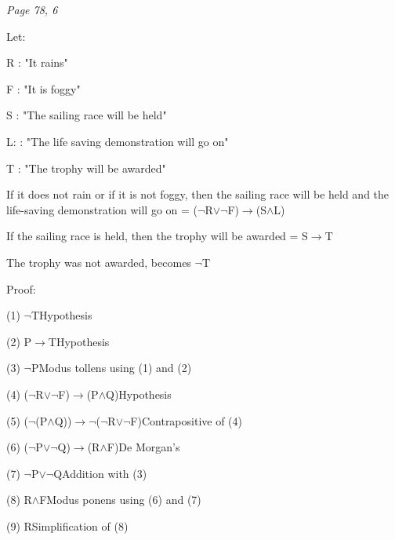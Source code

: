 \documentclass{article}
\begin{document}
\begin{flushleft}
\textit{Page 78, 6}\par

Let: \par
R : "It rains"\par
F : "It is foggy"\par
S : "The sailing race will be held"\par
L: : "The life saving demonstration will go on"\par
T : "The trophy will be awarded"\par
\vspace{0.25cm}
If it does not rain or if it is not foggy, then the sailing race will be held and the life-saving demonstration will go on =
(\(\lnot\)R\(\lor\lnot\)F)\(\rightarrow\)(S\(\land\)L)\par
If the sailing race is held, then the trophy will be awarded =  S\(\rightarrow\)T\par
The trophy was not awarded, becomes \(\lnot\)T\par
\vspace{0.25cm}

Proof:\par
(1) \(\lnot\)T\hspace{3.5cm}Hypothesis\par
(2) P\(\rightarrow\)T\hspace{3.15cm}Hypothesis\par
(3) \(\lnot\)P\hspace{3.5cm}Modus tollens using (1) and (2)\par
(4) (\(\lnot\)R\(\lor\lnot\)F)\(\rightarrow\)(P\(\land\)Q)\hspace{1.15cm}Hypothesis\par
(5) (\(\lnot\)(P\(\land\)Q))\(\rightarrow\lnot\)(\(\lnot\)R\(\lor\lnot\)F)\hspace{0.3cm}Contrapositive of (4)\par
(6) (\(\lnot\)P\(\lor\lnot\)Q)\(\rightarrow\)(R\(\land\)F)\hspace{1.15cm}De Morgan's\par
(7) \(\lnot\)P\(\lor\lnot\)Q\hspace{2.75cm}Addition with (3)\par
(8) R\(\land\)F\hspace{3.25cm}Modus ponens using (6) and (7)\par
(9) R\hspace{3.75cm}Simplification of (8)
\end{flushleft}
\end{document}
